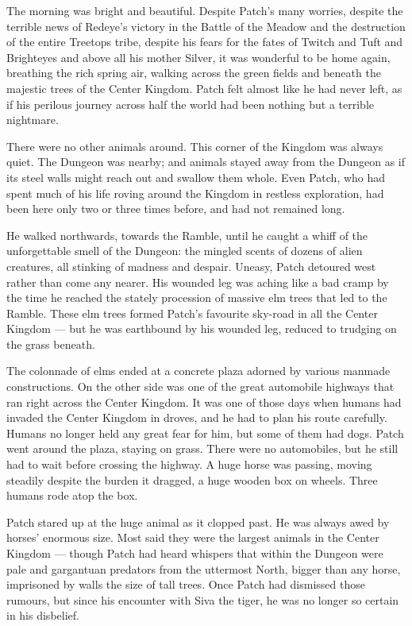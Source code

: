 \documentclass[12pt]{book}
\begin{document}
The morning was bright and beautiful. Despite Patch's many worries,
despite the terrible news of Redeye's victory in the Battle of the
Meadow and the destruction of the entire Treetops tribe, despite his
fears for the fates of Twitch and Tuft and Brighteyes and above all
his mother Silver, it was wonderful to be home again, breathing the
rich spring air, walking across the green fields and beneath the
majestic trees of the Center Kingdom. Patch felt almost like he had
never left, as if his perilous journey across half the world had been
nothing but a terrible nightmare.

There were no other animals around. This corner of the Kingdom was
always quiet. The Dungeon was nearby; and animals stayed away from the
Dungeon as if its steel walls might reach out and swallow them
whole. Even Patch, who had spent much of his life roving around the
Kingdom in restless exploration, had been here only two or three times
before, and had not remained long.

He walked northwards, towards the Ramble, until he caught a whiff of
the unforgettable smell of the Dungeon: the mingled scents of dozens
of alien creatures, all stinking of madness and despair. Uneasy, Patch
detoured west rather than come any nearer. His wounded leg was aching
like a bad cramp by the time he reached the stately procession of
massive elm trees that led to the Ramble. These elm trees formed
Patch's favourite sky-road in all the Center Kingdom --- but he was
earthbound by his wounded leg, reduced to trudging on the grass
beneath.

The colonnade of elms ended at a concrete plaza adorned by various
manmade constructions. On the other side was one of the great
automobile highways that ran right across the Center Kingdom. It was
one of those days when humans had invaded the Center Kingdom in
droves, and he had to plan his route carefully. Humans no longer held
any great fear for him, but some of them had dogs. Patch went around
the plaza, staying on grass. There were no automobiles, but he still
had to wait before crossing the highway. A huge horse was passing,
moving steadily despite the burden it dragged, a huge wooden box on
wheels. Three humans rode atop the box.

Patch stared up at the huge animal as it clopped past. He was always
awed by horses' enormous size. Most said they were the largest animals
in the Center Kingdom --- though Patch had heard whispers that within
the Dungeon were pale and gargantuan predators from the uttermost
North, bigger than any horse, imprisoned by walls the size of tall
trees. Once Patch had dismissed those rumours, but since his encounter
with Siva the tiger, he was no longer so certain in his disbelief.
\end{document}
